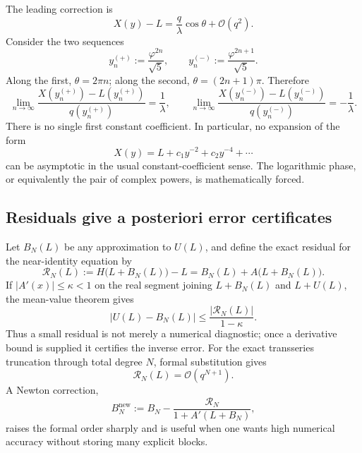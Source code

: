 \documentclass[11pt,oneside]{article}
\numberwithin{equation}{section}
\newcommand{\bigO}{\mathcal{O}}
\begin{document}
The leading correction is
\begin{equation}
  X(y)-L=\frac q\lambda\cos\theta+\bigO(q^2).
  \label{eq:leading-osc-correction}
\end{equation}
Consider the two sequences
\begin{equation}
 y_n^{(+)}:=\frac{\varphi^{2n}}{\sqrt5},
 \qquad
 y_n^{(-)}:=\frac{\varphi^{2n+1}}{\sqrt5}.
 \label{eq:phase-sequences}
\end{equation}
Along the first, \(\theta=2\pi n\); along the second,
\(\theta=(2n+1)\pi\).  Therefore
\begin{equation}
 \lim_{n\to\infty}\frac{X(y_n^{(+)})-L(y_n^{(+)})}{q(y_n^{(+)})}
 =\frac1\lambda,
 \qquad
 \lim_{n\to\infty}\frac{X(y_n^{(-)})-L(y_n^{(-)})}{q(y_n^{(-)})}
 =-\frac1\lambda.
 \label{eq:no-limit}
\end{equation}
There is no single first constant coefficient.  In particular, no expansion of
the form
\begin{equation}
  X(y)=L+c_1y^{-2}+c_2y^{-4}+\cdots
\end{equation}
can be asymptotic in the usual constant-coefficient sense.  The logarithmic
phase, or equivalently the pair of complex powers, is mathematically forced.

\subsection{Residuals give a posteriori error certificates}

Let \(B_N(L)\) be any approximation to \(U(L)\), and define the exact residual
for the near-identity equation by
\begin{equation}
  \mathcal{R}_N(L):=H\bigl(L+B_N(L)\bigr)-L
  =B_N(L)+A\bigl(L+B_N(L)\bigr).
  \label{eq:residual-def}
\end{equation}
If \(|A'(x)|\le\kappa<1\) on the real segment joining
\(L+B_N(L)\) and \(L+U(L)\), the mean-value theorem gives
\begin{equation}
  |U(L)-B_N(L)|\le\frac{|\mathcal{R}_N(L)|}{1-\kappa}.
  \label{eq:residual-bound}
\end{equation}
Thus a small residual is not merely a numerical diagnostic; once a derivative
bound is supplied it certifies the inverse error.  For the exact transseries
truncation through total degree \(N\), formal substitution gives
\begin{equation}
  \mathcal{R}_N(L)=\bigO(q^{N+1}).
\end{equation}
A Newton correction,
\begin{equation}
  B_N^{\mathrm{new}}
  :=B_N-\frac{\mathcal{R}_N}{1+A'(L+B_N)},
  \label{eq:Newton-correction}
\end{equation}
raises the formal order sharply and is useful when one wants high numerical
accuracy without storing many explicit blocks.
\end{document}
